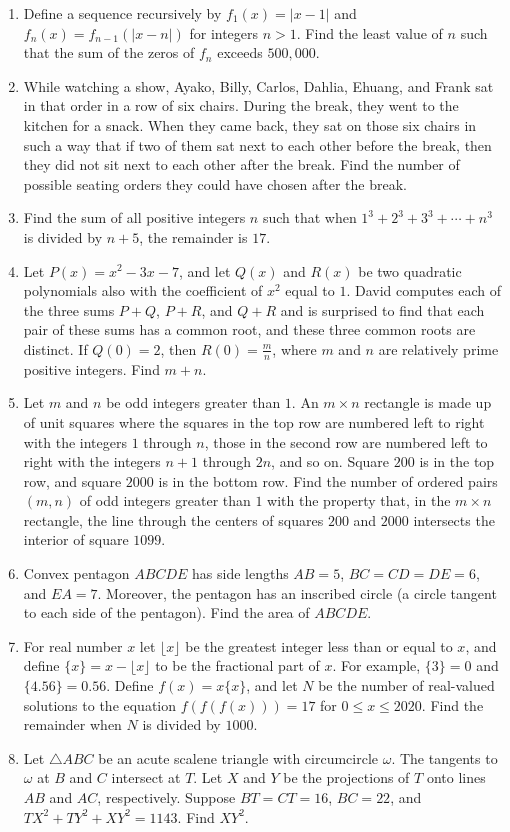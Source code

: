 \documentclass{article}%
\begin{document}
\begin{enumerate}
%
\item%
Define a sequence recursively by $f_1(x)=|x-1|$ and $f_n(x)=f_{n-1}(|x-n|)$ for integers $n>1$. Find the least value of $n$ such that the sum of the zeros of $f_n$ exceeds $500,000$.
%
\item%
While watching a show, Ayako, Billy, Carlos, Dahlia, Ehuang, and Frank sat in that order in a row of six chairs. During the break, they went to the kitchen for a snack. When they came back, they sat on those six chairs in such a way that if two of them sat next to each other before the break, then they did not sit next to each other after the break. Find the number of possible seating orders they could have chosen after the break.
%
\item%
Find the sum of all positive integers $n$ such that when $1^3+2^3+3^3+\cdots +n^3$ is divided by $n+5$, the remainder is $17$.
%
\item%
Let $P(x) = x^2 - 3x - 7$, and let $Q(x)$ and $R(x)$ be two quadratic polynomials also with the coefficient of $x^2$ equal to $1$. David computes each of the three sums $P + Q$, $P + R$, and $Q + R$ and is surprised to find that each pair of these sums has a common root, and these three common roots are distinct. If $Q(0) = 2$, then $R(0) = \frac{m}{n}$, where $m$ and $n$ are relatively prime positive integers. Find $m + n$.
%
\item%
Let $m$ and $n$ be odd integers greater than $1.$ An $m\times n$ rectangle is made up of unit squares where the squares in the top row are numbered left to right with the integers $1$ through $n$, those in the second row are numbered left to right with the integers $n + 1$ through $2n$, and so on. Square $200$ is in the top row, and square $2000$ is in the bottom row. Find the number of ordered pairs $(m,n)$ of odd integers greater than $1$ with the property that, in the $m\times n$ rectangle, the line through the centers of squares $200$ and $2000$ intersects the interior of square $1099$.
%
\item%
Convex pentagon $ABCDE$ has side lengths $AB=5$, $BC=CD=DE=6$, and $EA=7$. Moreover, the pentagon has an inscribed circle (a circle tangent to each side of the pentagon). Find the area of $ABCDE$.
%
\item%
For real number $x$ let $\lfloor x\rfloor$ be the greatest integer less than or equal to $x$, and define $\{x\} = x - \lfloor x \rfloor$ to be the fractional part of $x$. For example, $\{3\} = 0$ and $\{4.56\} = 0.56$. Define $f(x)=x\{x\}$, and let $N$ be the number of real-valued solutions to the equation $f(f(f(x)))=17$ for $0\leq x\leq 2020$. Find the remainder when $N$ is divided by $1000$.
%
\item%
Let $\triangle ABC$ be an acute scalene triangle with circumcircle $\omega$. The tangents to $\omega$ at $B$ and $C$ intersect at $T$. Let $X$ and $Y$ be the projections of $T$ onto lines $AB$ and $AC$, respectively. Suppose $BT = CT = 16$, $BC = 22$, and $TX^2 + TY^2 + XY^2 = 1143$. Find $XY^2$.
%
\end{enumerate}

%
\end{document}
